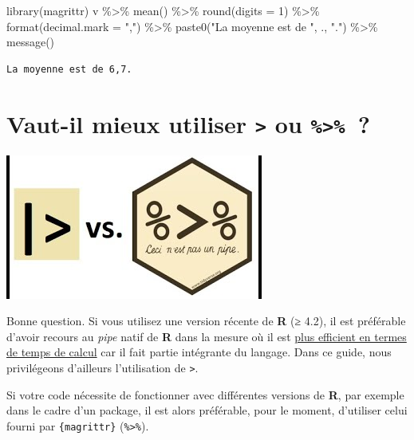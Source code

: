 \documentclass[
  letterpaper,
  DIV=11,
  numbers=noendperiod,
  oneside]{scrreprt}
\newenvironment{Shaded}{\begin{snugshade}}{\end{snugshade}}
\newcommand{\AttributeTok}[1]{\textcolor[rgb]{0.40,0.45,0.13}{#1}}
\newcommand{\DecValTok}[1]{\textcolor[rgb]{0.68,0.00,0.00}{#1}}
\newcommand{\FunctionTok}[1]{\textcolor[rgb]{0.28,0.35,0.67}{#1}}
\newcommand{\NormalTok}[1]{\textcolor[rgb]{0.00,0.23,0.31}{#1}}
\newcommand{\SpecialCharTok}[1]{\textcolor[rgb]{0.37,0.37,0.37}{#1}}
\newcommand{\StringTok}[1]{\textcolor[rgb]{0.13,0.47,0.30}{#1}}
\begin{document}
\begin{Shaded}
\begin{Highlighting}[]
\FunctionTok{library}\NormalTok{(magrittr)}
\NormalTok{v }\SpecialCharTok{\%\textgreater{}\%} 
  \FunctionTok{mean}\NormalTok{() }\SpecialCharTok{\%\textgreater{}\%}
  \FunctionTok{round}\NormalTok{(}\AttributeTok{digits =} \DecValTok{1}\NormalTok{) }\SpecialCharTok{\%\textgreater{}\%}
  \FunctionTok{format}\NormalTok{(}\AttributeTok{decimal.mark =} \StringTok{","}\NormalTok{) }\SpecialCharTok{\%\textgreater{}\%}
  \FunctionTok{paste0}\NormalTok{(}\StringTok{"La moyenne est de "}\NormalTok{, ., }\StringTok{"."}\NormalTok{) }\SpecialCharTok{\%\textgreater{}\%}
  \FunctionTok{message}\NormalTok{()}
\end{Highlighting}
\end{Shaded}

\begin{verbatim}
La moyenne est de 6,7.
\end{verbatim}

\hypertarget{vaut-il-mieux-utiliser-ou}{%
\section{\texorpdfstring{Vaut-il mieux utiliser
\texttt{\textbar{}\textgreater{}} ou
\texttt{\%\textgreater{}\%}~?}{Vaut-il mieux utiliser \textbar\textgreater{} ou \%\textgreater\%~?}}\label{vaut-il-mieux-utiliser-ou}}

\includegraphics{manipulation/ressources/native_pipe_vs_magrittr.jpg}

Bonne question. Si vous utilisez une version récente de \textbf{R} (≥
4.2), il est préférable d'avoir recours au \emph{pipe} natif de
\textbf{R} dans la mesure où il est
\href{https://michaelbarrowman.co.uk/post/the-new-base-pipe/}{plus
efficient en termes de temps de calcul} car il fait partie intégrante du
langage. Dans ce guide, nous privilégeons d'ailleurs l'utilisation de
\texttt{\textbar{}\textgreater{}}.

Si votre code nécessite de fonctionner avec différentes versions de
\textbf{R}, par exemple dans le cadre d'un package, il est alors
préférable, pour le moment, d'utiliser celui fourni par
\texttt{\{magrittr\}} (\texttt{\%\textgreater{}\%}).
\end{document}
